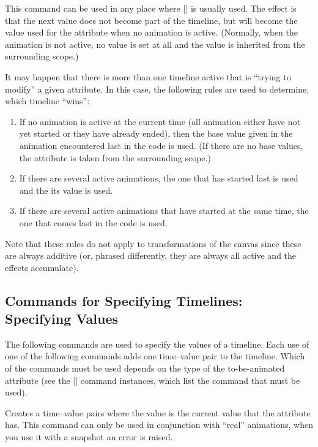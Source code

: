 \begin{command}{\pgfsysanimkeybase}
\end{command}
%
\begin{command}{\pgfsys@animation@base}
    This command can be used in any place where |\pgfsys@animation@time| is
    usually used. The effect is that the next value does not become part of the
    timeline, but will become the value used for the attribute when no
    animation is active. (Normally, when the animation is not active, no value
    is set at all and the value is inherited from the surrounding scope.)
\end{command}

It may happen that there is more than one timeline active that is ``trying to
modify'' a given attribute. In this case, the following rules are used to
determine, which timeline ``wins'':
%
\begin{enumerate}
    \item If no animation is active at the current time (all animation either
        have not yet started or they have already ended), then the base value
        given in the animation encountered last in the code is used. (If there
        are no base values, the attribute is taken from the surrounding scope.)
    \item If there are several active animations, the one that has started last
        is used and the its value is used.
    \item If there are several active animations that have started at the same
        time, the one that comes last in the code is used.
\end{enumerate}

Note that these rules do not apply to transformations of the canvas since these
are always additive (or, phrased differently, they are always all active and
the effects accumulate).


\subsection{Commands for Specifying Timelines: Specifying Values}

The following commands are used to specify the values of a timeline. Each use
of one of the following commands adds one time--value pair to the timeline.
Which of the commands must be used depends on the type of the to-be-animated
attribute (see the |\pgfsysanimate| command instances, which list the command
that must be used).

\begin{command}{\pgfsysanimvalcurrent}
\end{command}
\begin{command}{\pgfsys@animation@val@current}
    Creates a time--value pairs where the value is the current value that the
    attribute has. This command can only be used in conjunction with ``real''
    animations, when you use it with a snapshot an error is raised.
\end{command}


